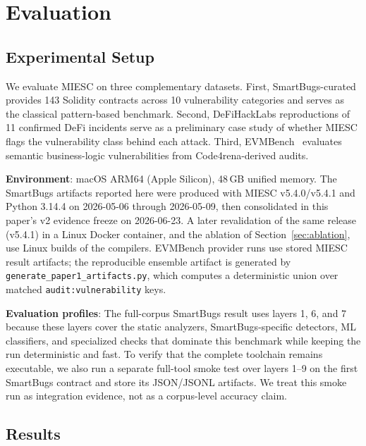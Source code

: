 \documentclass[conference]{IEEEtran}
\begin{document}
\section{Evaluation}

\subsection{Experimental Setup}

We evaluate MIESC on three complementary datasets. First, SmartBugs-curated~\cite{ferreira2020smartbugs,durieux2020empirical} provides 143 Solidity contracts across 10 vulnerability categories and serves as the classical pattern-based benchmark. Second, DeFiHackLabs reproductions of 11 confirmed DeFi incidents serve as a preliminary case study of whether MIESC flags the vulnerability class behind each attack. Third, EVMBench~\cite{evmbench2026} evaluates semantic business-logic vulnerabilities from Code4rena-derived audits.

\textbf{Environment}: macOS ARM64 (Apple Silicon), 48\,GB unified memory. The SmartBugs artifacts reported here were produced with MIESC v5.4.0/v5.4.1 and Python 3.14.4 on 2026-05-06 through 2026-05-09, then consolidated in this paper's v2 evidence freeze on 2026-06-23. A later revalidation of the same release (v5.4.1) in a Linux Docker container, and the ablation of Section~\ref{sec:ablation}, use Linux builds of the compilers. EVMBench provider runs use stored MIESC result artifacts; the reproducible ensemble artifact is generated by \texttt{generate\_paper1\_artifacts.py}, which computes a deterministic union over matched \texttt{audit:vulnerability} keys.

\textbf{Evaluation profiles}: The full-corpus SmartBugs result uses layers 1, 6, and 7 because these layers cover the static analyzers, SmartBugs-specific detectors, ML classifiers, and specialized checks that dominate this benchmark while keeping the run deterministic and fast. To verify that the complete toolchain remains executable, we also run a separate full-tool smoke test over layers 1--9 on the first SmartBugs contract and store its JSON/JSONL artifacts. We treat this smoke run as integration evidence, not as a corpus-level accuracy claim.

\subsection{Results}
\end{document}
